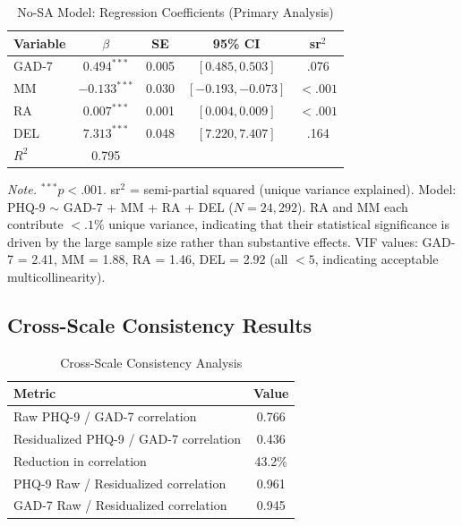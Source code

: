 \documentclass[10pt,twocolumn]{article}
\begin{document}
\begin{table}[t]
\centering
\caption{No-SA Model: Regression Coefficients (Primary Analysis)}
\label{tab:regression}
\footnotesize
\begin{tabular}{@{}lcccc@{}}
\toprule
\textbf{Variable} & \textbf{$\beta$} & \textbf{SE} & \textbf{95\% CI} & \textbf{sr$^2$} \\
\midrule
GAD-7 & $0.494^{***}$ & 0.005 & $[0.485, 0.503]$ & .076 \\
MM & $-0.133^{***}$ & 0.030 & $[-0.193, -0.073]$ & $<.001$ \\
RA & $0.007^{***}$ & 0.001 & $[0.004, 0.009]$ & $<.001$ \\
DEL & $7.313^{***}$ & 0.048 & $[7.220, 7.407]$ & .164 \\
\midrule
$R^2$ & 0.795 & & & \\
\bottomrule
\end{tabular}
\smallskip
\footnotesize \textit{Note.} $^{***}p<.001$. sr$^2$ = semi-partial squared (unique variance explained). Model: PHQ-9 $\sim$ GAD-7 + MM + RA + DEL ($N = 24{,}292$). RA and MM each contribute $<.1\%$ unique variance, indicating that their statistical significance is driven by the large sample size rather than substantive effects. VIF values: GAD-7 = 2.41, MM = 1.88, RA = 1.46, DEL = 2.92 (all $< 5$, indicating acceptable multicollinearity).
\end{table}

\subsection{Cross-Scale Consistency Results}

\begin{table}[t]
\centering
\caption{Cross-Scale Consistency Analysis}
\label{tab:validation}
\begin{tabular}{@{}lc@{}}
\toprule
\textbf{Metric} & \textbf{Value} \\
\midrule
Raw PHQ-9 / GAD-7 correlation & 0.766 \\
Residualized PHQ-9 / GAD-7 correlation & 0.436 \\
Reduction in correlation & 43.2\% \\
PHQ-9 Raw / Residualized correlation & 0.961 \\
GAD-7 Raw / Residualized correlation & 0.945 \\
\bottomrule
\end{tabular}
\end{table}
\end{document}
